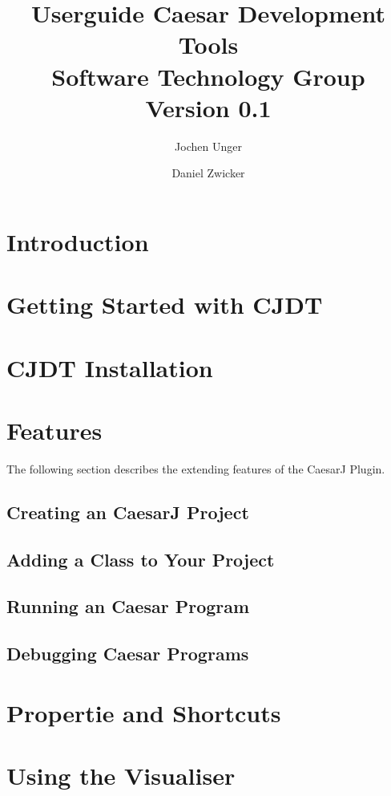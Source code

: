 \documentclass[a4paper,12pt,twoside,titlepage]{article}
\title{\textbf{Userguide Caesar Development Tools}\\\small{Software Technology Group}\\\small{Version 0.1}}
\author{Jochen Unger\and Daniel Zwicker}
\begin{document}
\maketitle
\tableofcontents

\newpage
\section{Introduction}


\newpage
\section{Getting Started with CJDT}


\newpage
\section{CJDT Installation}



\newpage
\section{Features}
The following section describes the extending features of the CaesarJ Plugin. 
\subsection{Creating an CaesarJ Project}


\subsection{Adding a Class to Your Project}




\subsection{Running an Caesar Program}


\subsection{Debugging Caesar Programs}


\newpage
\section{Propertie and Shortcuts}


\newpage
\section{Using the Visualiser}

\end{document}
